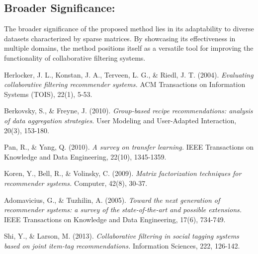 \documentclass{article}
\begin{document}
\subsection{Broader Significance:}
The broader significance of the proposed method lies in its adaptability to diverse datasets characterized by sparse matrices. By showcasing its effectiveness in multiple domains, the method positions itself as a versatile tool for improving the functionality of collaborative filtering systems.

\begin{thebibliography}{}
  Herlocker, J. L., Konstan, J. A., Terveen, L. G., \& Riedl, J. T. (2004).
  \emph{Evaluating collaborative filtering recommender systems.}
  ACM Transactions on Information Systems (TOIS), 22(1), 5-53.

  Berkovsky, S., \& Freyne, J. (2010).
  \emph{Group-based recipe recommendations: analysis of data aggregation strategies.}
  User Modeling and User-Adapted Interaction, 20(3), 153-180.

  Pan, R., \& Yang, Q. (2010).
  \emph{A survey on transfer learning.}
  IEEE Transactions on Knowledge and Data Engineering, 22(10), 1345-1359.

  Koren, Y., Bell, R., \& Volinsky, C. (2009).
  \emph{Matrix factorization techniques for recommender systems.}
  Computer, 42(8), 30-37.

  Adomavicius, G., \& Tuzhilin, A. (2005).
  \emph{Toward the next generation of recommender systems: a survey of the state-of-the-art and possible extensions.}
  IEEE Transactions on Knowledge and Data Engineering, 17(6), 734-749.

  Shi, Y., \& Larson, M. (2013).
  \emph{Collaborative filtering in social tagging systems based on joint item-tag recommendations.}
  Information Sciences, 222, 126-142.
\end{thebibliography}
\end{document}
